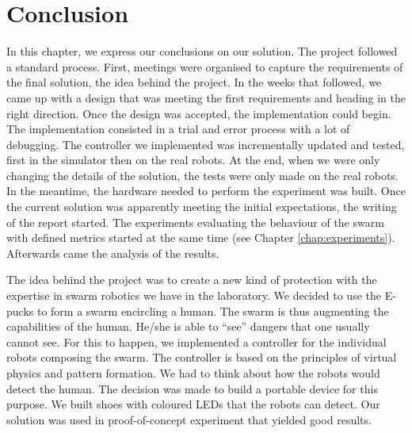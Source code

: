 \documentclass[oneside, a4paper, 12pt]{memoir}
\begin{document}
\chapter{Conclusion}

	
	In this chapter, we express our conclusions on our solution. The project followed a standard process. First, meetings were organised to capture the requirements of the final solution, the idea behind the project. In the weeks that followed, we came up with a design that was meeting the first requirements and heading in the right direction. Once the design was accepted, the implementation could begin. The implementation consisted in a trial and error process with a lot of debugging. The controller we implemented was incrementally updated and tested, first in the simulator then on the real robots. At the end, when we were only changing the details of the solution, the tests were only made on the real robots. In the meantime, the hardware needed to perform the experiment was built. Once the current solution was apparently meeting the initial expectations, the writing of the report started. The experiments evaluating the behaviour of the swarm with defined metrics started at the same time (see Chapter \ref{chap:experiments}). Afterwards came the analysis of the results.
	
	The idea behind the project was to create a new kind of protection with the expertise in swarm robotics we have in the laboratory. We decided to use the E-pucks \citep{mondada2009puck} to form a swarm encircling a human. The swarm is thus augmenting the capabilities of the human. He/she is able to \enquote{see} dangers that one usually cannot see. For this to happen, we implemented a controller for the individual robots composing the swarm. The controller is based on the principles of virtual physics and pattern formation. We had to think about how the robots would detect the human. The decision was made to build a portable device for this purpose. We built shoes with coloured LEDs that the robots can detect. Our solution was used in proof-of-concept experiment that yielded good results.
	
\end{document}
